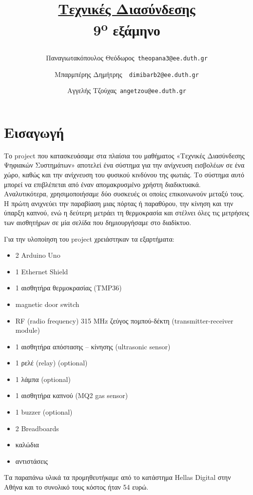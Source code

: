 \documentclass[twoside,a4paper]{article}
\author{
  Παναγιωτακόπουλος Θεόδωρος\      \texttt{theopana3@ee.duth.gr}
  \and
  Μπαρμπέρης Δημήτρης\      \texttt{ dimibarb2@ee.duth.gr}
  \and
  Αγγελής Τζούχας\      \texttt{angetzou@ee.duth.gr}
}
\title{\begin{doublespacing}{\Large\textbf{\underline{Τεχνικές Διασύνδεσης} \\ {\large 9\textsuperscript{o} εξάμηνο}}} \end{doublespacing}}
\date{}
\begin{document}
\maketitle
\thispagestyle{fancy}
\setlength{\parskip}{0.6em}
\section{ Εισαγωγή}
 \begin{flushleft}
\par Το project που κατασκευάσαμε στα πλαίσια του μαθήματος «Τεχνικές Διασύνδεσης Ψηφιακών Συστημάτων» αποτελεί ένα σύστημα για την ανίχνευση εισβολέων σε ένα χώρο, καθώς και την ανίχνευση του φυσικού κινδύνου της φωτιάς. Το σύστημα αυτό μπορεί να επιβλέπεται από έναν απομακρυσμένο χρήστη διαδικτυακά. 
\\ Αναλυτικότερα, χρησιμοποιήσαμε δύο συσκευές οι οποίες επικοινωνούν μεταξύ τους. Η πρώτη ανιχνεύει την παραβίαση μιας πόρτας ή παραθύρου, την κίνηση και την ύπαρξη καπνού, ενώ η δεύτερη μετράει τη θερμοκρασία και στέλνει όλες τις μετρήσεις των αισθητήρων σε μία σελίδα που δημιουργήσαμε στο διαδίκτυο.
\par 
Για την υλοποίηση του project χρειάστηκαν τα εξαρτήματα:
\begin{itemize}
\item 2 Arduino Uno
\item 1 Ethernet Shield
\item 1 αισθητήρα θερμοκρασίας (TMP36)
\item magnetic door switch
\item RF (radio frequency) 315 MHz ζεύγος πομπού-δέκτη (transmitter-receiver module)
\item 1 αισθητήρα απόστασης – κίνησης (ultrasonic sensor)
\item 1 ρελέ (relay) (optional)
\item 1 λάμπα (optional)
\item 1 αισθητήρα καπνού (MQ2 gas sensor)
\item 1 buzzer (optional)
\item 2 Breadboards
\item καλώδια 
\item αντιστάσεις

\end{itemize}

\par 
Τα παραπάνω υλικά τα προμηθευτήκαμε από το κατάστημα Hellas Digital στην Αθήνα και το συνολικό τους κόστος ήταν 54 ευρώ.
 \end{flushleft}
\end{document}
